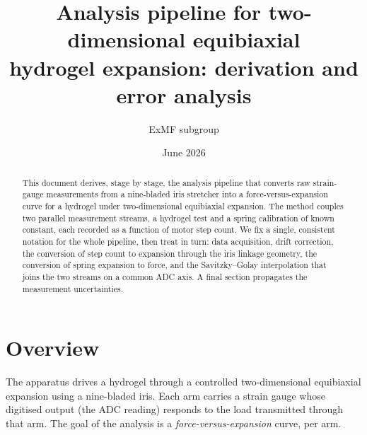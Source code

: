 \documentclass[11pt]{article}
\title{\color{navy}\bfseries Analysis pipeline for two-dimensional equibiaxial\\ hydrogel expansion: derivation and error analysis}
\author{ExMF subgroup}
\date{June 2026}
\begin{document}
\maketitle

\begin{abstract}
\noindent
This document derives, stage by stage, the analysis pipeline that converts raw
strain-gauge measurements from a nine-bladed iris stretcher into a force-versus-expansion
curve for a hydrogel under two-dimensional equibiaxial expansion. The method couples two
parallel measurement streams, a hydrogel test and a spring calibration of known constant,
each recorded as a function of motor step count. We fix a single, consistent notation for
the whole pipeline, then treat in turn: data acquisition, drift correction, the conversion
of step count to expansion through the iris linkage geometry, the conversion of spring
expansion to force, and the Savitzky--Golay interpolation that joins the two streams on a
common ADC axis. A final section propagates the measurement uncertainties.
\end{abstract}

\section{Overview}
The apparatus drives a hydrogel through a controlled two-dimensional equibiaxial expansion
using a nine-bladed iris. Each arm carries a strain gauge whose digitised output (the ADC
reading) responds to the load transmitted through that arm. The goal of the analysis is a
\emph{force-versus-expansion} curve, per arm.
\end{document}
